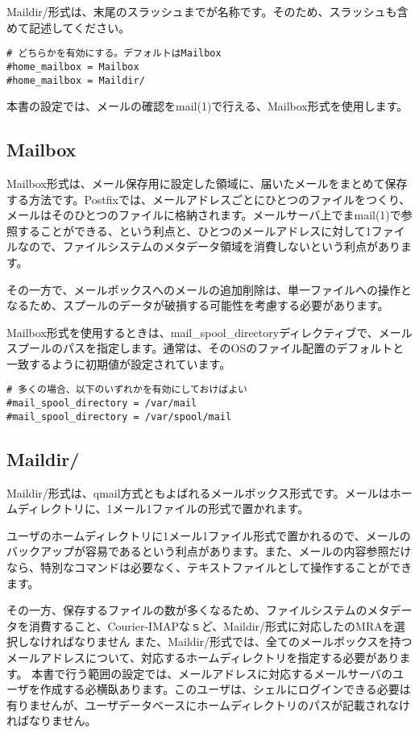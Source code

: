 Maildir/形式は、末尾のスラッシュまでが名称です。そのため、スラッシュも含めて記述してください。

\begin{lstlisting}[basicstyle=\ttfamily\footnotesize, frame=single]
# どちらかを有効にする。デフォルトはMailbox
#home_mailbox = Mailbox
#home_mailbox = Maildir/
\end{lstlisting}

本書の設定では、メールの確認をmail(1)で行える、Mailbox形式を使用します。

\subsection{Mailbox}

Mailbox形式は、メール保存用に設定した領域に、届いたメールをまとめて保存する方法です。Postfixでは、メールアドレスごとにひとつのファイルをつくり、メールはそのひとつのファイルに格納されます。メールサーバ上でまmail(1)で参照することができる、という利点と、ひとつのメールアドレスに対して1ファイルなので、ファイルシステムのメタデータ領域を消費しないという利点があります。

その一方で、メールボックスへのメールの追加削除は、単一ファイルへの操作となるため、スプールのデータが破損する可能性を考慮する必要があります。

Mailbox形式を使用するときは、mail\_spool\_directoryディレクティブで、メールスプールのパスを指定します。通常は、そのOSのファイル配置のデフォルトと一致するように初期値が設定されています。

\begin{lstlisting}[basicstyle=\ttfamily\footnotesize, frame=single]
# 多くの場合、以下のいずれかを有効にしておけばよい
#mail_spool_directory = /var/mail
#mail_spool_directory = /var/spool/mail
\end{lstlisting}

\subsection{Maildir/}
Maildir/形式は、qmail方式ともよばれるメールボックス形式です。メールはホームディレクトリに、1メール1ファイルの形式で置かれます。

ユーザのホームディレクトリに1メール1ファイル形式で置かれるので、メールのバックアップが容易であるという利点があります。また、メールの内容参照だけなら、特別なコマンドは必要なく、テキストファイルとして操作することができます。

その一方、保存するファイルの数が多くなるため、ファイルシステムのメタデータを消費すること、Courier-IMAPなｓど、Maildir/形式に対応したのMRAを選択しなければなりません
また、Maildir/形式では、全てのメールボックスを持つメールアドレスについて、対応するホームディレクトリを指定する必要があります。
本書で行う範囲の設定では、メールアドレスに対応するメールサーバのユーザを作成する必横臥あります。このユーザは、シェルにログインできる必要は有りませんが、ユーザデータベースにホームディレクトリのパスが記載されなければなりません。

